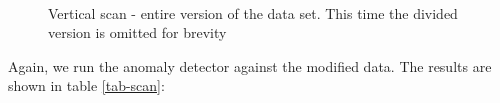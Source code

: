 \documentclass[12pt,a4paper,cucitura]{toptesi}
\begin{document}
\begin{figure}
\centering
{}
\\
\caption[Vertical scan - entire data set]{Vertical scan - entire version of the data set. This time the divided version is omitted for brevity}
\end{figure}

Again, we run the anomaly detector against the modified data. The results are shown in table \ref{tab-scan}:
\end{document}

